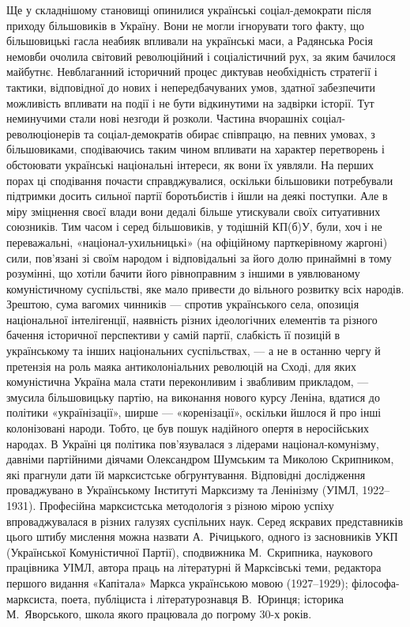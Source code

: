Ще у складнішому становищі опинилися українські соціал-демократи 
після приходу більшовиків в Україну. Вони не могли ігнорувати того 
факту, що більшовицькі гасла неабияк впливали на українські маси, а 
Радянська Росія немовби очолила світовий революційний і 
соціалістичний рух, за яким бачилося майбутнє. Невблаганний 
історичний процес диктував необхідність стратегії і тактики, 
відповідної до нових і непередбачуваних умов, здатної забезпечити 
можливість впливати на події і не бути відкинутими на задвірки 
історії. Тут неминучими стали нові незгоди й розколи. Частина 
вчорашніх соціал-революціонерів та соціал-демократів обирає 
співпрацю, на певних умовах, з більшовиками, сподіваючись таким чином 
впливати на характер перетворень і обстоювати українські національні 
інтереси, як вони їх уявляли. На перших порах ці сподівання почасти 
справджувалися, оскільки більшовики потребували підтримки досить 
сильної партії боротьбистів і йшли на деякі поступки. Але в міру 
зміцнення своєї влади вони дедалі більше утискували своїх 
ситуативних союзників. Тим часом і серед більшовиків, у тодішній 
КП(б)У, були, хоч і не переважальні, «націонал-ухильницькі» (на 
офіційному парткерівному жаргоні) сили, пов'язані зі своїм народом і 
відповідальні за його долю принаймні в тому розумінні, що хотіли 
бачити його рівноправним з іншими в уявлюваному комуністичному 
суспільстві, яке мало привести до вільного розвитку всіх народів. 
Зрештою, сума вагомих чинників — спротив українського села, опозиція 
національної інтелігенції, наявність різних ідеологічних елементів 
та різного бачення історичної перспективи у самій партії, слабкість 
її позицій в українському та інших національних суспільствах, — а не в 
останню чергу й претензія на роль маяка антиколоніальних революцій на 
Сході, для яких комуністична Україна мала стати переконливим і 
звабливим прикладом, — змусила більшовицьку партію, на виконання 
нового курсу Леніна, вдатися до політики «українізації», ширше —
«коренізації», оскільки йшлося й про інші колонізовані народи. Тобто, 
це був пошук надійного опертя в неросійських народах. В Україні ця 
політика пов'язувалася з лідерами націонал-комунізму, давніми 
партійними діячами Олександром Шумським та Миколою Скрипником, які 
прагнули дати їй марксистське обгрунтування. Відповідні дослідження 
проваджувано в Українському Інституті Марксизму та Ленінізму (УІМЛ, 
1922--1931). Професійна марксистська методологія з різною мірою успіху 
впроваджувалася в різних галузях суспільних наук. Серед яскравих 
представників цього штибу мислення можна назвати А.~Річицького, 
одного із засновників УКП (Української Комуністичної Партії), 
сподвижника М.~Скрипника, наукового працівника УІМЛ, автора праць на 
літературні й Марксівські теми, редактора першого видання «Капітала» 
Маркса українською мовою (1927--1929); філософа-марксиста, поета, 
публіциста і літературознавця В.~Юринця; історика М.~Яворського, школа 
якого працювала до погрому 30-х років. 


